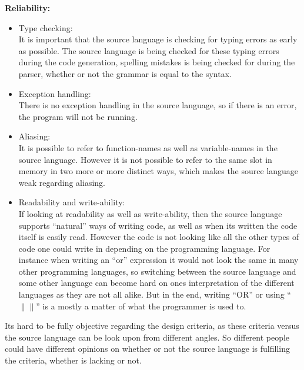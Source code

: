 \textbf{Reliability:} \\
\begin{itemize}
\item Type checking: \\
It is important that the source language is checking for typing errors as early as possible. The source language is being checked for these typing errors during the code generation, spelling mistakes is being checked for during the parser, whether or not the grammar is equal to the syntax.
\item Exception handling: \\
There is no exception handling in the source language, so if there is an error, the program will not be running.
\item Aliasing: \\
It is possible to refer to function-names as well as variable-names in the source language. However it is not possible to refer to the same slot in memory in two more or more distinct ways, which makes the source language weak regarding aliasing. 
\item Readability and write-ability: \\
If looking at readability as well as write-ability, then the source language supports ``natural'' ways of writing code, as well as when its written the code itself is easily read. However the code is not looking like all the other types of code one could write in depending on the programming language. For instance when writing an ``or'' expression it would not look the same in many other programming languages, so switching between the source language and some other language can become hard on ones interpretation of the different languages as they are not all alike. But in the end, writing ``OR'' or using ``$\|\|$'' is a mostly a matter of what the programmer is used to. 
\end{itemize}
Its hard to be fully objective regarding the design criteria, as these criteria versus the source language can be look upon from different angles. So different people could have different opinions on whether or not the source language is fulfilling the criteria, whether is lacking or not. 